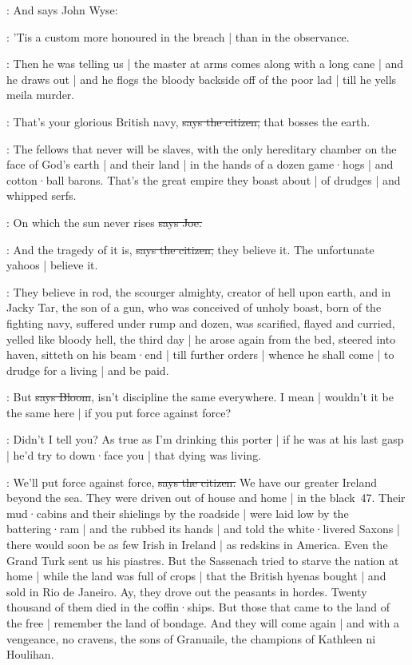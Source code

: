 \Nq:
And says John Wyse:

\johnwyse:
'Tis a custom more honoured in the breach |
than in the observance.

\Nq:
Then he was telling us |
the master at arms
comes along with a long cane |
and he draws out |
and he flogs the bloody backside off of the poor lad |
till he yells meila murder.

\citizen:
That's your glorious British navy,
\sout{says the citizen,}
that bosses the earth.

\citizen:
The fellows that never will be slaves,
with the only hereditary chamber on the face of God's earth |
and their land |
in the hands of a dozen game·hogs |
and cotton·ball barons.
That's the great empire they boast about |
of drudges |
and whipped serfs.%

\joe:
On which the sun never rises
\sout{says Joe.}

\citizen:
And the tragedy of it is,
\sout{says the citizen,}
they believe it.
The unfortunate yahoos |
believe it.

:
They believe in rod,
the scourger almighty,
creator of hell upon earth,
and in Jacky Tar,
the son of a gun,
who was conceived of unholy boast,
born of the fighting navy,
suffered under rump and dozen,
was scarified,
flayed and curried,
yelled like bloody hell,
the third day |
he arose again from the bed,
steered into haven,
sitteth on his beam·end |
till further orders |
whence he shall come |
to drudge for a living |
and be paid.

\Bloom:
But
\sout{says Bloom},
isn't discipline the same everywhere.
I mean |
wouldn't it be the same here |
if you put force against force?

\Nq:
Didn't I tell you?
As true as I'm drinking this porter |
if he was at his last gasp |
he'd try to down·face you |
that dying was living.

\citizen:
We'll put force against force,
\sout{says the citizen.}
We have our greater Ireland beyond the sea.
They were driven out of house and home |
in the black~47.
Their mud·cabins and their shielings by the roadside |
were laid low by the battering·ram |
and the  rubbed its hands |
and told the white·livered Saxons |
there would soon be as few Irish in Ireland |
as redskins in America.
Even the Grand Turk sent us his piastres.
But the Sassenach tried to starve the nation at home
 |
while the land was full of crops |
that the British hyenas bought |
and sold in Rio de Janeiro.
Ay,
they drove out the peasants in hordes.
Twenty thousand of them died in the coffin·ships.
But those that came to the land of the free |
remember the land of bondage.
And they will come again |
and with a vengeance,
no cravens,
the sons of Granuaile,
the champions of Kathleen ni Houlihan.


